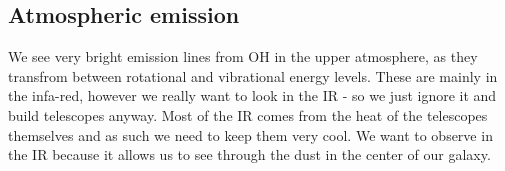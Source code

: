 \subsection{Atmospheric emission}
We see very bright emission lines from OH in the upper atmosphere, as they
transfrom between rotational and vibrational energy levels. These are mainly
in the infa-red, however we really want to look in the IR - so we just ignore it
and build telescopes anyway. Most of the IR comes from the heat of the
telescopes themselves and as such we need to keep them very cool. We want to
observe in the IR because it allows us to see through the dust in the center of
our galaxy.

